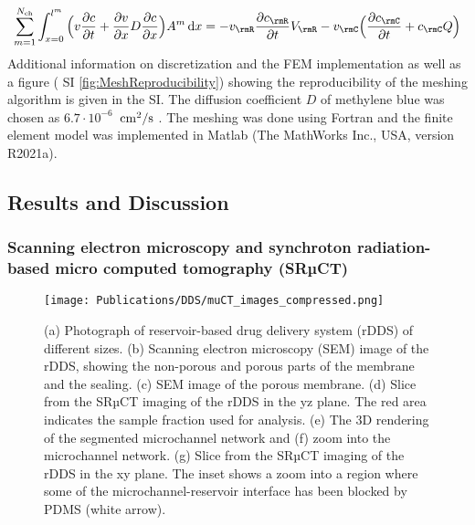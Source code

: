 \begin{align}
  \sum_{m=1}^{N_{\rm ch}} \int_{x=0}^{l^m}  \Big( v\frac{\partial c}{\partial t} + \frac{\partial v}{\partial x}D\frac{\partial c}{\partial x} \Big) A^m \, \rmd x = -v_\rmR \frac{\partial c_\rmR}{\partial t} V_\rmR - v_\rmC \Big( \frac{\partial c_\rmC}{\partial t} + c_\rmC Q\Big)
\end{align}
Additional information on discretization and the FEM implementation as well as a figure ( SI \cref{fig:MeshReproducibility}) showing the reproducibility of the meshing algorithm is given in the SI. The diffusion coefficient $D$ of methylene blue was chosen as $6.7\cdot10^{-6}$~${\rm cm^2/s}$ \supercite{selifonov2019determination}. The meshing was done using Fortran and the finite element model was implemented in Matlab (The MathWorks Inc., USA, version R2021a).

\subsection{Results and Discussion}
\subsubsection{Scanning electron microscopy and synchroton radiation-based micro computed tomography (SRµCT)}
\begin{figure}[h!]
  \centering
  \texttt{[image: Publications/DDS/muCT\_images\_compressed.png]}
  \caption{(a) Photograph of reservoir-based drug delivery system (rDDS) of different sizes. (b) Scanning electron microscopy (SEM) image of the rDDS, showing the non-porous and porous parts of the membrane and the sealing. (c) SEM image of the porous membrane. (d) Slice from the SRµCT imaging of the rDDS in the yz plane. The red area indicates the sample fraction used for analysis. (e) The 3D rendering of the segmented microchannel network and (f) zoom into the microchannel network. (g) Slice from the SRµCT imaging of the rDDS in the xy plane. The inset shows a zoom into a region where some of the microchannel-reservoir interface has been blocked by PDMS (white arrow).}
  \label{fig:muCT_images}
\end{figure}

